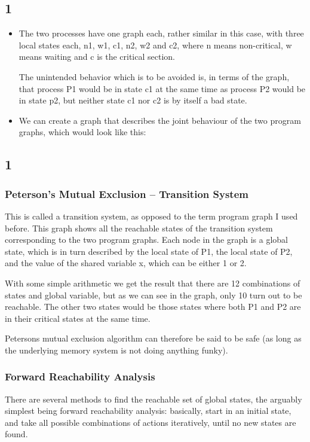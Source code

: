 \documentclass[handout]{beamer}
\begin{document}
\begin{footnotesize}
\subsection*{1}
\begin{frame}
\begin{itemize}
\item
The two processes have one graph each, rather similar in this case, with three local states each, n1, w1, c1, n2, w2 and c2, where n means non-critical, w means waiting and c is the critical section.

The unintended behavior which is to be avoided is, in terms of the graph, that process P1 would be in state c1 at the same time as process P2 would be in state p2, but neither state c1 nor c2 is by itself a bad state.
\item
We can create a graph that describes the joint behaviour of the two program graphs, which would look like this:


\end{itemize}
\end{frame}

\subsection*{1}
\begin{frame}
  \frametitle{Peterson's Mutual Exclusion -- Transition System}
This is called a transition system, as opposed to the term program graph I used before. This graph shows all the reachable states of the transition system corresponding to the two program graphs. Each node in the graph is a global state, which is in turn described by the local state of P1, the local state of P2, and the value of the shared variable x, which can be either 1 or 2.

With some simple arithmetic we get the result that there are 12 combinations of states and global variable, but as we can see in the graph, only 10 turn out to be reachable. The other two states would be those states where both P1 and P2 are in their critical states at the same time.

Petersons mutual exclusion algorithm can therefore be said to be safe (as long as the underlying memory system is not doing anything funky).
\end{frame}


\begin{frame}
\frametitle{Forward Reachability Analysis}
There are several methods to find the reachable set of global states, the arguably simplest being forward reachability analysis: basically, start in an initial state, and take all possible combinations of actions iteratively, until no new states are found.


\end{frame}
\end{footnotesize}
\end{document}
